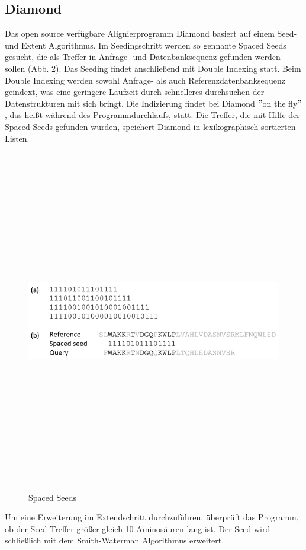 \documentclass[10pt, a4paper]{article}[08.12.2015]
\begin{document}
    
    \subsection{\textrm{Diamond}}    
    Das open source verf\"ugbare Alignierprogramm Diamond \cite{buchfink2014} basiert auf einem Seed- und Extent Algorithmus. Im Seedingschritt werden so gennante Spaced Seeds gesucht, die als Treffer in Anfrage- und Datenbanksequenz gefunden werden sollen (Abb. 2). Das Seeding findet anschlie{\ss}end mit Double Indexing statt. Beim Double Indexing werden sowohl Anfrage- als auch Referenzdatenbanksequenz geindext, was eine geringere Laufzeit durch schnelleres durchsuchen der Datenstrukturen mit sich bringt. Die Indizierung findet bei Diamond $"$on the fly$"$, das hei{\ss}t w\"ahrend des Programmdurchlaufs, statt. Die Treffer, die mit Hilfe der Spaced Seeds gefunden wurden, speichert Diamond in lexikographisch sortierten Listen.
\begin{figure}[h]
\centering
      \noindent\includegraphics[width=\linewidth,height=15cm,
      keepaspectratio]{Abbildungen/diamond_spacedSeeds.jpg}
      \caption{Spaced Seeds}
\end{figure}
\newline
    Um eine Erweiterung im Extendschritt durchzuf\"uhren, \"uberpr\"uft das Programm, ob der Seed-Treffer gr\"o{\ss}er-gleich 10 Aminos\"auren lang ist. Der Seed wird schlie{\ss}lich mit dem Smith-Waterman Algorithmus erweitert.
\newline
    
\end{document}
